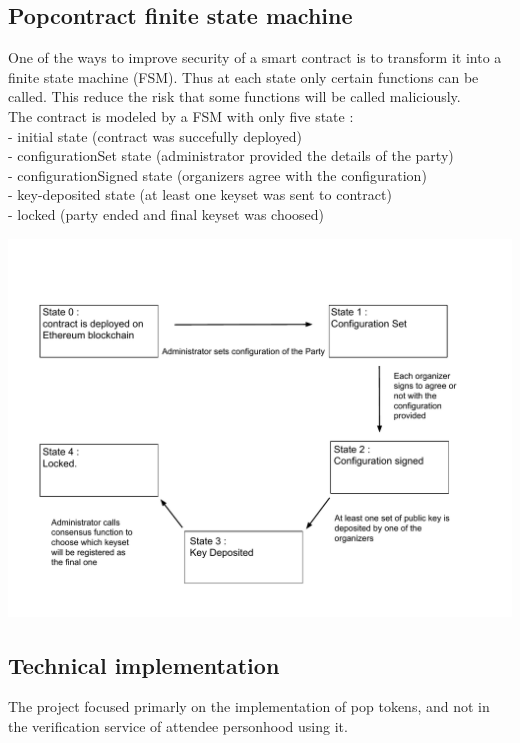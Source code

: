 \documentclass[11pt, a4paper, twoside, openright]{book} %
\begin{document}
\subsection{Popcontract finite state machine}
One of the ways to improve security of a smart contract is to transform it into a finite state machine (FSM). Thus at each state only certain functions can be called. This reduce the risk that some functions will be called maliciously.\\ The contract is modeled by a FSM with only five state : \\- initial state (contract was succefully deployed)\\ - configurationSet state (administrator provided the details of the party) \\ - configurationSigned state (organizers agree with the configuration) \\ - key-deposited state (at least one keyset was sent to contract)\\ - locked (party ended and final keyset was choosed)

\begin{minipage}{1\linewidth}
    \includegraphics[scale = 0.67]{fsm.pdf}
\end{minipage}%

\subsection{Technical implementation}
The project focused primarly on the implementation of pop tokens, and not in the verification service of attendee personhood using it.
\end{document}
